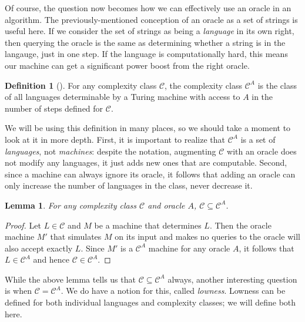\documentclass[english]{reedthesis}
\theoremstyle{plain}
\newtheorem{lemma}[lemma]{Lemma}
\theoremstyle{definition}
\newtheorem{defn}[defn]{Definition}
\theoremstyle{remark}
\begin{document}
Of course, the question now becomes how we can effectively use an oracle in an
algorithm. The previously-mentioned conception of an oracle as a set of strings
is useful here. If we consider the set of strings as being a \emph{language} in
its own right, then querying the oracle is the same as determining whether a
string is in the langauge, just in one step. If the language is computationally
hard, this means our machine can get a significant power boost from the right
oracle.

\begin{defn}[{\cite[Def.\ 2.1]{AW09}}]\label{def:oracle-class}
  For any complexity class $\mathcal{C}$, the complexity class $\mathcal{C}^{A}$ is the class of all
  languages determinable by a Turing machine with access to $A$ in the number of
  steps defined for $\mathcal{C}$.
\end{defn}

We will be using this definition in many places, so we should take a moment to
look at it in more depth. First, it is important to realize that $\mathcal{C}^{A}$ is a
set of \emph{languages}, not \emph{machines}: despite the notation, augmenting
$\mathcal{C}$ with an oracle does not modify any languages, it just adds new ones that are
computable. Second, since a machine can always ignore its oracle, it follows
that adding an oracle can only increase the number of languages in the class,
never decrease it.

\begin{lemma}\label{thm:relativizing-increases}
  For any complexity class $\mathcal{C}$ and oracle $A$, $\mathcal{C} \subseteq \mathcal{C}^{A}$.
\end{lemma}

\begin{proof}
  Let $L \in \mathcal{C}$ and $M$ be a machine that determines $L$. Then the oracle machine
  $M'$ that simulates $M$ on its input and makes no queries to the oracle will
  also accept exactly $L$. Since $M'$ is a $\mathcal{C}^{A}$ machine for any oracle $A$,
  it follows that $L \in \mathcal{C}^{A}$ and hence $\mathcal{C} \in \mathcal{C}^{A}$.
\end{proof}

While the above lemma tells us that $\mathcal{C} \subseteq \mathcal{C}^{A}$ always, another interesting
question is when $\mathcal{C} = \mathcal{C}^{A}$. We do have a notion for this, called
\emph{lowness}. Lowness can be defined for both individual languages and
complexity classes; we will define both here.
\end{document}
